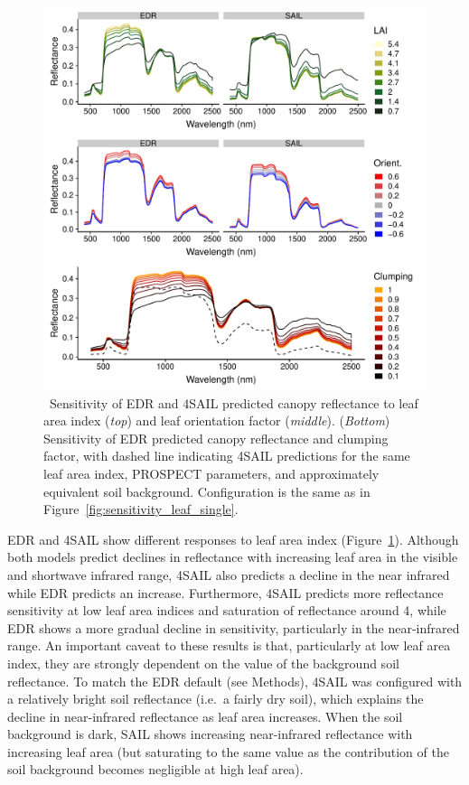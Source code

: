 \begin{figure}
  \centering
  \includegraphics[width=\textwidth]{4_edr/figures/explore_spectra/sensitivity_single_pft.pdf}
  \caption{\
    Sensitivity of EDR and 4SAIL predicted canopy reflectance to leaf area index (\textit{top}) and leaf orientation factor (\textit{middle}).
    (\textit{Bottom}) Sensitivity of EDR predicted canopy reflectance and clumping factor,
    with dashed line indicating 4SAIL predictions for the same leaf area index, PROSPECT parameters, and approximately equivalent soil background.
    Configuration is the same as in Figure~\ref{fig:sensitivity_leaf_single}.
  }\label{fig:sensitivity_structure_single}
\end{figure}


EDR and 4SAIL show different responses to leaf area index (Figure~\ref{fig:sensitivity_structure_single}).
Although both models predict declines in reflectance with increasing leaf area in the visible and shortwave infrared range,
4SAIL also predicts a decline in the near infrared while EDR predicts an increase.
Furthermore, 4SAIL predicts more reflectance sensitivity at low leaf area indices and saturation of reflectance around 4, while EDR shows a more gradual decline in sensitivity, particularly in the near-infrared range. 
An important caveat to these results is that, particularly at low leaf area index, they are strongly dependent on the value of the background soil reflectance.
To match the EDR default (see Methods), 4SAIL was configured with a relatively bright soil reflectance (i.e.\ a fairly dry soil), which explains the decline in near-infrared reflectance as leaf area increases.
When the soil background is dark, SAIL shows increasing near-infrared reflectance with increasing leaf area (but saturating to the same value as the contribution of the soil background becomes negligible at high leaf area).

